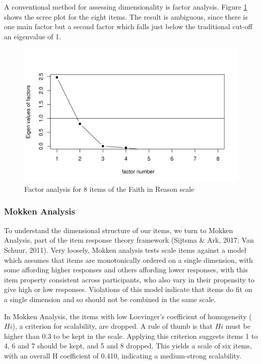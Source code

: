 \documentclass[
  ,jou,floatsintext]{apa6}
\begin{document}
A conventional method for assessing dimensionality is factor analysis. Figure \ref{fig:factor8} shows the scree plot for the eight items. The result is ambiguous, since there is one main factor but a second factor which falls just below the traditional cut-off an eigenvalue of 1.

\begin{figure}

{\centering \includegraphics[width=1\linewidth]{plots/reason_scree8} 

}

\caption{Factor analysis for 8 items of the Faith in Reason scale}\label{fig:factor8}
\end{figure}

\hypertarget{mokken-analysis}{%
\subsubsection{Mokken Analysis}\label{mokken-analysis}}

To understand the dimensional structure of our items, we turn to Mokken Analysis, part of the item response theory framework (Sijtsma \& Ark, 2017; Van Schuur, 2011). Very loosely, Mokken analysis tests scale items against a model which assumes that items are monotonically ordered on a single dimension, with some affording higher responses and others affording lower responses, with this item property consistent across participants, who also vary in their propensity to give high or low responses. Violations of this model indicate that items do fit on a single dimension and so should not be combined in the same scale.

In Mokken Analysis, the items with low Loevinger's coefficient of homogeneity (\(H i\)), a criterion for scalability, are dropped. A rule of thumb is that \(H i\) must be higher than 0.3 to be kept in the scale. Applying this criterion suggests items 1 to 4, 6 and 7 should be kept, and 5 and 8 dropped. This yields a scale of six items, with an overall H coefficient of 0.410, indicating a medium-strong scalability.
\end{document}
